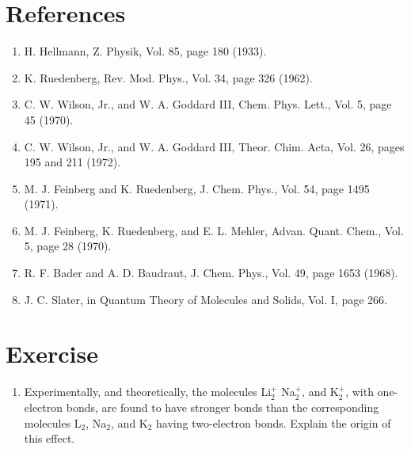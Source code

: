 \section{References}
\begin{enumerate}
\item  H. Hellmann, Z. Physik, Vol. 85, page 180 (1933).
      
\item  K. Ruedenberg, Rev. Mod. Phys., Vol. 34, page 326 (1962).
      
\item  C. W. Wilson, Jr., and W. A. Goddard III, Chem. Phys. Lett., 
Vol. 5, page 45 (1970).
    
\item  C. W. Wilson, Jr., and W. A. Goddard III, Theor. Chim. Acta, 
Vol. 26, pages 195 and 211 (1972).
    
\item  M. J. Feinberg and K. Ruedenberg, J. Chem. Phys., Vol. 54, 
page 1495 (1971).
    
\item  M. J. Feinberg, K. Ruedenberg, and E. L. Mehler, Advan. Quant. 
Chem., Vol. 5, page 28 (1970).
    
\item  R. F. Bader and A. D. Baudraut, J. Chem. Phys., Vol. 49, 
page 1653 (1968).
    
\item  J. C. Slater, in Quantum Theory of Molecules and Solids, 
Vol. I, page 266.
\end{enumerate}

\section{Exercise}
    
\begin{enumerate}
\item Experimentally, and theoretically, the molecules Li$^+_2$ 
Na$^+_2$, and K$^+_2$, with one-electron bonds, are found to have stronger 
bonds than the corresponding molecules L$_2$, Na$_2$, and K$_2$ having 
two-electron bonds.  Explain the origin of this effect.
\end{enumerate}

